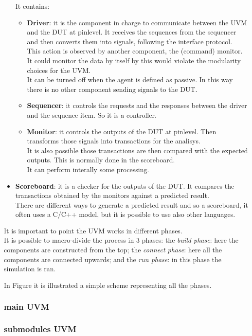 \begin{itemize}
    It contains:
    \begin{itemize}
        \item \textbf{Driver}: it is the component in charge to communicate between the UVM and the DUT at pinlevel. It receives the sequences from the sequencer and then converts them into signals, following the interface protocol.\\
        This action is observed by another component, the (command) monitor.
        It could monitor the data by itself by this would violate the modularity choices for the UVM.\\
        
        It can be turned off when the agent is defined as passive. In this way there is no other component sending signals to the DUT.

        
         \item \textbf{Sequencer}: it controls the requests and the responses between the driver and the sequence item. So it is a controller.
         
        \item \textbf{Monitor}: it controls the outputs of the DUT at pinlevel. Then transforms those signals into transactions for the analisys.\\
        It is also possible those transactions are then compared with the expected outputs. This is normally done in the scoreboard.\\
        It can perform interally some processing. 

        
    \end{itemize}
    
    \item \textbf{Scoreboard}: it is a checker for the outputs of the DUT. It compares the transactions obtained by the monitors against a predicted result.\\
    There are different ways to generate a predicted result and so a scoreboard, it often uses a C/C++ model, but it is possible to use also other languages.
    
\end{itemize}


It is important to point the UVM works in different phases.\\
It is possible to macro-divide the process in 3 phases: the \textit{build phase}: here the components are constructed from the top; the \textit{connect phase}: here all the components are connected upwards; and the \textit{run phase}: in this phase the simulation is ran.

In Figure %
it is illustrated a simple scheme representing all the phases.


\subsubsection{main UVM}

\subsubsection{submodules UVM}
